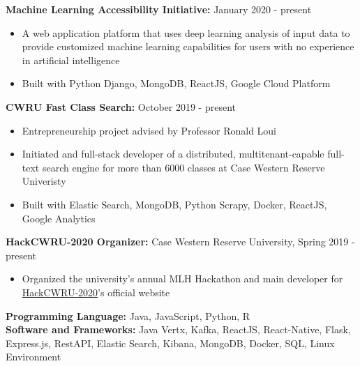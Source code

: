 \documentclass[a4paper,11pt]{article}
\begin{document}
\begin{flushleft}
	
	\textbf{Machine Learning Accessibility Initiative:} January 2020 - present
	\vspace{-\topsep}
	\begin{itemize}
		\setlength{\itemsep}{0pt plus 1pt}
		\item A web application platform that uses deep learning analysis of input data to provide customized machine learning capabilities for users with no experience in artificial intelligence
		\item Built with Python Django, MongoDB, ReactJS, Google Cloud Platform
	\end{itemize}
	
	
	\textbf{CWRU Fast Class Search:} October 2019 - present
	\vspace{-\topsep}
	\begin{itemize}
		\setlength{\itemsep}{0pt plus 1pt}
		\item Entrepreneurship project advised by Professor Ronald Loui
		\item Initiated and full-stack developer of a distributed, multitenant-capable full-text search engine for more than 6000 classes at Case Western Reserve Univeristy
		\item Built with Elastic Search, MongoDB, Python Scrapy, Docker, ReactJS, Google Analytics
	\end{itemize}
	
	

\end{flushleft}
\begin{flushleft}
	
	\textbf{HackCWRU-2020 Organizer: } Case Western Reserve University, Spring 2019 - 
	present
	\vspace{-\topsep}
	\begin{itemize}
		\setlength{\parskip}{2pt}
		\setlength{\itemsep}{0pt plus 1pt}
		\item Organized the university's annual MLH Hackathon and main developer for \href{https://hackcwru.info}{HackCWRU-2020}'s official website   \\
	\end{itemize}


	
\centering{\noindent\makebox{\rule{8cm}{1.5pt}}}
\end{flushleft} 
\begin{flushleft}
	\textbf{Programming Language:} Java, JavaScript, Python, R \\ 
	\doublespacing
	\textbf{Software and Frameworks:} Java Vertx, Kafka, ReactJS, React-Native, Flask, Express.js, RestAPI, Elastic Search, Kibana, MongoDB, Docker, SQL, Linux Environment\\
	\vspace{-\topsep}
	
\end{flushleft}
\end{document}
